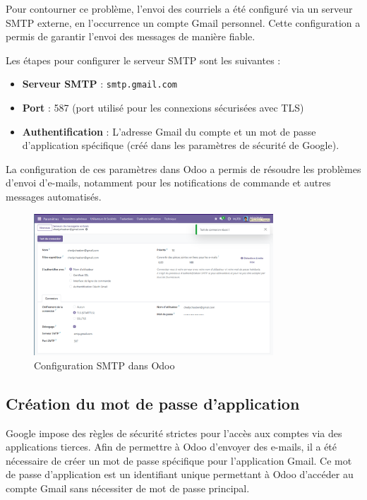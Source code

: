 \documentclass[12pt]{report}
\begin{document}
Pour contourner ce problème, l’envoi des courriels a été configuré via un serveur SMTP externe, en l’occurrence un compte Gmail personnel. Cette configuration a permis de garantir l'envoi des messages de manière fiable.

Les étapes pour configurer le serveur SMTP sont les suivantes :

\begin{itemize}
    \item \textbf{Serveur SMTP} : \texttt{smtp.gmail.com}
    \item \textbf{Port} : 587 (port utilisé pour les connexions sécurisées avec TLS)
    \item \textbf{Authentification} : L'adresse Gmail du compte et un mot de passe d’application spécifique (créé dans les paramètres de sécurité de Google).
\end{itemize}

La configuration de ces paramètres dans Odoo a permis de résoudre les problèmes d’envoi d’e-mails, notamment pour les notifications de commande et autres messages automatisés.

\begin{figure}[H]
\centering
\includegraphics[width=0.8\textwidth]{images/configurationSMTPODOO.PNG}
\caption{Configuration SMTP dans Odoo}
\end{figure}

\subsection{Création du mot de passe d’application}

Google impose des règles de sécurité strictes pour l’accès aux comptes via des applications tierces. Afin de permettre à Odoo d’envoyer des e-mails, il a été nécessaire de créer un mot de passe spécifique pour l’application Gmail. Ce mot de passe d’application est un identifiant unique permettant à Odoo d’accéder au compte Gmail sans nécessiter de mot de passe principal.
\end{document}
